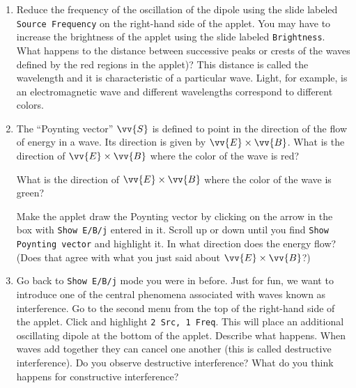 \begin{enumerate}
\item Reduce the frequency of the oscillation of the dipole using the slide labeled
{\tt Source Frequency} on the right-hand side of the applet.
You may have to increase the brightness of the applet using the slide labeled
{\tt Brightness}.
What happens to the distance between successive peaks or crests of the waves defined by the red regions in the
applet)?
This distance is called the wavelength and it is characteristic of a particular
wave.
Light, for example,  is an electromagnetic wave and different wavelengths correspond 
to different colors.
\vspace{2.0cm}


\item The ``Poynting vector'' $\vv{S}$ is defined to point in the direction of the flow of energy in a wave. Its direction is given by $\vv {E} \times \vv {B}$.  What is the direction of $\vv {E}\times \vv {B}$ where the color of the wave is red?
\vspace{1.0cm}

What is the direction of $\vv {E} \times \vv {B}$ where the color of the wave is green?
\vspace{1.0cm}

Make the applet draw the Poynting vector by clicking on the arrow in the box with 
{\tt Show E/B/j} entered in it. Scroll up or down until you find
{\tt Show Poynting vector} and highlight it.
In what direction does the energy flow?  (Does that agree with what you just said about $\vv {E} \times \vv {B}$?)
\vspace{1.0cm}

\item Go back to {\tt Show E/B/j} mode you were in before. 
Just for fun, we want to introduce one of the central phenomena associated
with waves known as interference.
Go to the second menu from the top of the right-hand side of the applet.
Click and highlight {\tt 2 Src, 1 Freq}.
This will place an additional oscillating dipole at the bottom of the applet.
Describe what happens.
When waves add together they can cancel one another (this is called destructive 
interference).
Do you observe destructive interference?
What do you think happens for constructive interference?
\vspace{1.5cm}


\end{enumerate}
